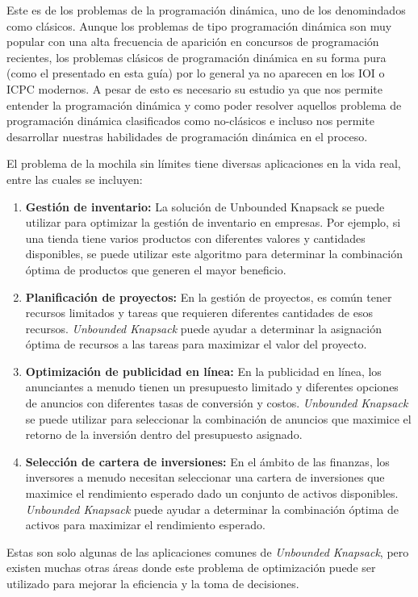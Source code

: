 Este es de los problemas de la programación dinámica, uno de los denomindados como clásicos. Aunque los problemas de tipo programación dinámica son muy popular con una alta frecuencia de aparición en concursos de programación
recientes, los problemas clásicos de programación dinámica en su forma pura (como el presentado en esta guía) por lo general ya no aparecen en los IOI o ICPC modernos. A pesar de esto es necesario su estudio ya
que nos permite entender la programación dinámica y como poder resolver aquellos problema de programación dinámica clasificados como no-clásicos e incluso nos permite desarrollar nuestras habilidades de programación
dinámica en el proceso.

El problema de la mochila sin límites tiene diversas aplicaciones en la vida real, entre las cuales se incluyen:

\begin{enumerate}
	\item \textbf{Gestión de inventario:} La solución de Unbounded Knapsack se puede utilizar para optimizar la gestión de inventario en empresas. Por ejemplo, si una tienda tiene varios productos con diferentes valores y cantidades disponibles, se puede utilizar este algoritmo para determinar la combinación óptima de productos que generen el mayor beneficio.
	
	\item \textbf{Planificación de proyectos:} En la gestión de proyectos, es común tener recursos limitados y tareas que requieren diferentes cantidades de esos recursos. \emph{Unbounded Knapsack} puede ayudar a determinar la asignación óptima de recursos a las tareas para maximizar el valor del proyecto.
	
	\item \textbf{Optimización de publicidad en línea:} En la publicidad en línea, los anunciantes a menudo tienen un presupuesto limitado y diferentes opciones de anuncios con diferentes tasas de conversión y costos. \emph{Unbounded Knapsack} se puede utilizar para seleccionar la combinación de anuncios que maximice el retorno de la inversión dentro del presupuesto asignado.
	
	\item \textbf{Selección de cartera de inversiones: }En el ámbito de las finanzas, los inversores a menudo necesitan seleccionar una cartera de inversiones que maximice el rendimiento esperado dado un conjunto de activos disponibles. \emph{Unbounded Knapsack} puede ayudar a determinar la combinación óptima de activos para maximizar el rendimiento esperado.
\end{enumerate}

Estas son solo algunas de las aplicaciones comunes de \emph{Unbounded Knapsack}, pero existen muchas otras áreas donde este problema de optimización puede ser utilizado para mejorar la eficiencia y la toma de decisiones.
